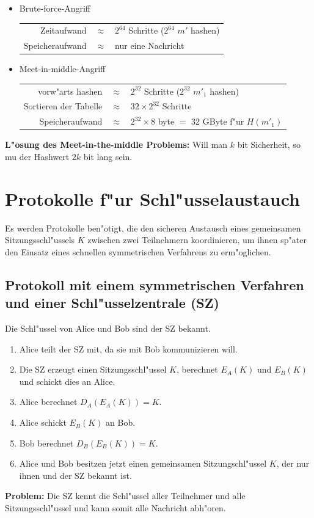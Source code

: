 \begin{itemize}
   \item Brute-force-Angriff \\
     \begin{tabular}{rcl}
       Zeitaufwand     & $\approx$ & $2^{64}$ Schritte ($2^{64}$ $m'$ hashen) \\
       Speicheraufwand & $\approx$ & nur eine Nachricht
     \end{tabular} 
   \item Meet-in-middle-Angriff \\
     \begin{tabular}{rcl}
       vorw"arts hashen      & $\approx$ & $2^{32}$ Schritte ($2^{32}$ $m'_1$ hashen)          \\
       Sortieren der Tabelle & $\approx$ & $32 \times 2^{32}$ Schritte                         \\
       Speicheraufwand       & $\approx$ & $2^{32} \times 8$ byte $=$ 32 GByte f"ur $H(m'_1)$
    \end{tabular}
\end{itemize}
{\bf L"osung des Meet-in-the-middle Problems:} Will man $k$ bit
Sicherheit, so mu\3 der Hashwert $2k$ bit lang sein.


\section{Protokolle f"ur Schl"usselaustauch} 

Es werden Protokolle ben"otigt, die den sicheren Austausch eines
gemeinsamen Sitzungs\-schl"ussels $K$ zwischen zwei Teilnehmern
koordinieren, um ihnen sp"ater den Einsatz eines schnellen
symmetrischen Verfahrens zu erm"oglichen.

\subsection{Protokoll mit einem symmetrischen Verfahren und einer Schl"usselzentrale (SZ)}\label{SZmitSymmSchl}
  Die Schl"ussel von Alice und Bob sind der SZ bekannt. 
  \begin{enumerate}
     \item Alice teilt der SZ mit, da\3 sie mit Bob kommunizieren 
           will.
     \item Die SZ erzeugt einen Sitzungsschl"ussel $K$, berechnet 
           $E_A(K)$ und $E_B(K)$ und schickt dies an Alice.
     \item Alice berechnet $D_A(E_A(K))=K$.
     \item Alice schickt $E_B(K)$ an Bob.
     \item Bob berechnet $D_B(E_B(K))=K$.
     \item Alice und Bob besitzen jetzt einen gemeinsamen 
           Sitzungschl"ussel $K$, der nur ihnen und der SZ bekannt ist.
  \end{enumerate}
{\bf Problem:} Die SZ kennt die Schl"ussel aller Teilnehmer und alle
Sitzungsschl"ussel und kann somit alle Nachricht abh"oren.

